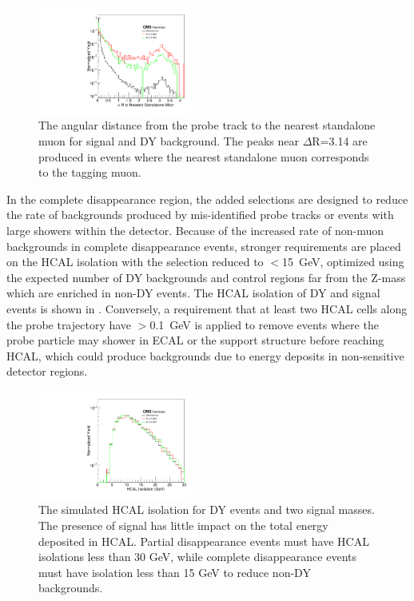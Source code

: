 \begin{figure}[htpb]
	\centering
	\includegraphics[width=0.45\textwidth]{figures/allEventsDrtoNearestStandalone_stack.pdf}
	\caption[Standalone Muon Displacement]{The angular distance from the probe track to the nearest standalone muon for signal and DY background. The peaks near $\Delta$R=3.14 are produced in events where the nearest standalone muon corresponds to the tagging muon.}
	\label{fig:staDR}
\end{figure}

In the complete disappearance region, the added selections are designed to reduce the rate of backgrounds produced by mis-identified probe tracks or events with large showers within the detector.
Because of the increased rate of non-muon backgrounds in complete disappearance events, stronger requirements are placed on the HCAL isolation with the selection reduced to $<$\SI{15}{\giga\eV}, optimized using the expected number of DY backgrounds and control regions far from the Z-mass which are enriched in non-DY events.
The HCAL isolation of DY and signal events is shown in .
Conversely, a requirement that at least two HCAL cells along the probe trajectory have $>$\SI{0.1}{\giga\eV} is applied to remove events where the probe particle may shower in ECAL or the support structure before reaching HCAL, which could produce backgrounds due to energy deposits in non-sensitive detector regions.

\begin{figure}[htpb]
	\centering
	\includegraphics[width=0.45\textwidth]{figures/allEventshcalIso0p3_stack.pdf}
	\caption[HCAL Isolation]{The simulated HCAL isolation for DY events and two signal masses. The presence of signal has little impact on the total energy deposited in HCAL. Partial disappearance events must have HCAL isolations less than 30 GeV, while complete disappearance events must have isolation less than 15 GeV to reduce non-DY backgrounds.}
	\label{fig:hcalIso}
\end{figure}


